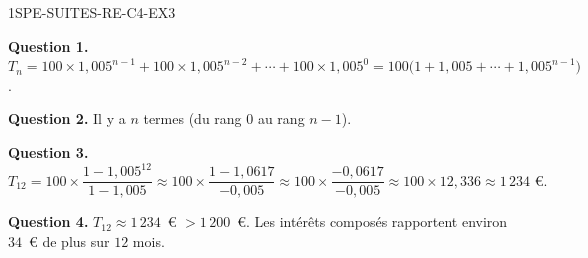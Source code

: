 
\begin{corrige}{1SPE-SUITES-RE-C4-EX3}

\textbf{Question 1.} $T_n = 100 \times 1{,}005^{n-1} + 100 \times 1{,}005^{n-2} + \cdots + 100 \times 1{,}005^0 = 100 \bigl(1 + 1{,}005 + \cdots + 1{,}005^{n-1}\bigr)$.

\textbf{Question 2.} Il y a $n$ termes (du rang $0$ au rang $n-1$).

\textbf{Question 3.}
\[
T_{12} = 100 \times \frac{1 - 1{,}005^{12}}{1 - 1{,}005} \approx 100 \times \frac{1 - 1{,}0617}{-0{,}005} \approx 100 \times \frac{-0{,}0617}{-0{,}005} \approx 100 \times 12{,}336 \approx 1\,234 \text{ €.}
\]

\textbf{Question 4.} $T_{12} \approx 1\,234$~€ $> 1\,200$~€. Les intérêts composés rapportent environ $34$~€ de plus sur $12$ mois.

\end{corrige}
